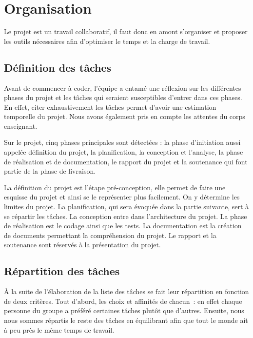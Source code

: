 \documentclass[a4paper,12pt]{article}
\begin{document}
\section{Organisation}
Le projet est un travail collaboratif, il faut donc en amont s’organiser et proposer les outils nécessaires afin d’optimiser le temps et la charge de travail.

\subsection{Définition des tâches}
Avant de commencer à coder, l’équipe a entamé une réflexion sur les différentes phases du projet et les tâches qui seraient susceptibles d’entrer dans ces phases. 
En effet, citer exhaustivement les tâches permet d’avoir une estimation temporelle du projet. 
Nous avons également pris en compte les attentes du corps enseignant.

Sur le projet, cinq phases principales sont détectées : la phase d'initiation aussi appelée définition du projet, la planification, la conception et l'analyse, la phase de réalisation et de documentation, le rapport du projet et la soutenance qui font partie de la phase de livraison.

La définition du projet est l’étape pré-conception, elle permet de faire une esquisse du projet et ainsi se le représenter plus facilement. 
On y détermine les limites du projet. 
La planification, qui sera évoquée dans la partie suivante, sert à se répartir les tâches. 
La conception entre dans l’architecture du projet.
La phase de réalisation est le codage ainsi que les tests. 
La documentation est la création de documents permettant la compréhension du projet. 
Le rapport et la soutenance sont réservés à la présentation du projet.

\subsection{Répartition des tâches}
À la suite de l’élaboration de la liste des tâches se fait leur répartition en fonction de deux critères. 
Tout d’abord, les choix et affinités de chacun : en effet chaque personne du groupe a préféré certaines tâches plutôt que d’autres. 
Ensuite, nous nous sommes répartis le reste des tâches en équilibrant afin que tout le monde ait à peu près le même temps de travail.
\end{document}
